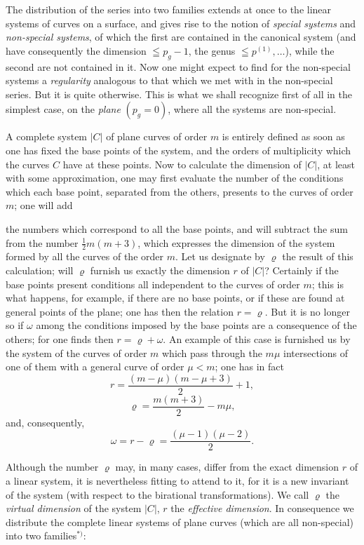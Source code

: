 \documentclass{article}
\begin{document}
The distribution of the series into two families extends at once to the linear systems of curves on a surface, and gives rise to the notion of \emph{special systems} and \emph{non-special systems}, of which the first are contained in the canonical system (and have consequently the dimension $\leqq p_{g} - 1$, the genus $\leqq p^{(1)}, \ldots$), while the second are not contained in it. Now one might expect to find for the non-special systems a \emph{regularity} analogous to that which we met with in the non-special series. But it is quite otherwise. This is what we shall recognize first of all in the simplest case, on the \emph{plane} $(p_{g} = 0)$, where all the systems are non-special.

A complete system $|C|$ of plane curves of order $m$ is entirely defined as soon as one has fixed the base points of the system, and the orders of multiplicity which the curves $C$ have at these points. Now to calculate the dimension of $|C|$, at least with some approximation, one may first evaluate the number of the conditions which each base point, separated from the others, presents to the curves of order $m$; one will add

the numbers which correspond to all the base points, and will subtract the sum from the number $\frac{1}{2} m(m+3)$, which expresses the dimension of the system formed by all the curves of the order $m$. Let us designate by $\varrho$ the result of this calculation; will $\varrho$ furnish us exactly the dimension $r$ of $|C|$? Certainly if the base points present conditions all independent to the curves of order $m$; this is what happens, for example, if there are no base points, or if these are found at general points of the plane; one has then the relation $r = \varrho$. But it is no longer so if $\omega$ among the conditions imposed by the base points are a consequence of the others; for one finds then $r = \varrho + \omega$. An example of this case is furnished us by the system of the curves of order $m$ which pass through the $m\mu$ intersections of one of them with a general curve of order $\mu < m$; one has in fact
\[ r = \frac{(m-\mu)(m-\mu+3)}{2} + 1, \]
\[ \varrho = \frac{m(m+3)}{2} - m\mu, \]
and, consequently,
\[ \omega = r - \varrho = \frac{(\mu-1)(\mu-2)}{2}. \]

Although the number $\varrho$ may, in many cases, differ from the exact dimension $r$ of a linear system, it is nevertheless fitting to attend to it, for it is a new invariant of the system (with respect to the birational transformations). We call $\varrho$ the \emph{virtual dimension} of the system $|C|$, $r$ the \emph{effective dimension}. In consequence we distribute the complete linear systems of plane curves (which are all non-special) into two families${}^{*)}$:
\end{document}
